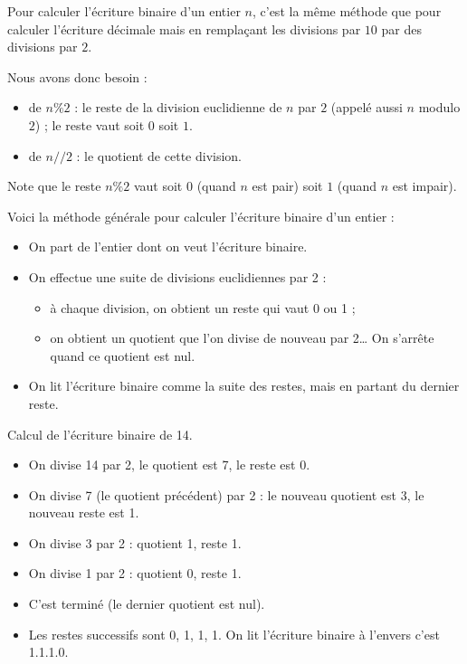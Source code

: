 \documentclass[11pt,class=report,crop=false]{standalone}
\begin{document}
\begin{cours}

Pour calculer l'écriture binaire d'un entier $n$, c'est la même méthode que pour calculer l'écriture décimale mais en remplaçant les divisions par $10$ par des divisions par $2$.

Nous avons donc besoin :
  \begin{itemize}
    \item de $n\%2$ : le reste de la division euclidienne de $n$ par $2$ (appelé aussi $n$ modulo $2$) ; le reste vaut soit $0$ soit $1$.
    \item de $n//2$ : le quotient de cette division. 
  \end{itemize}
  
  Note que le reste  $n\%2$ vaut soit $0$ (quand $n$ est pair) soit $1$ (quand $n$ est impair).
  
  Voici la méthode générale pour calculer l'écriture binaire d'un entier :
\begin{itemize}
  \item On part de l'entier dont on veut l'écriture binaire.
  
  \item On effectue une suite de divisions euclidiennes par 2 : 
  \begin{itemize}
    \item à chaque division, on obtient un reste qui vaut 0 ou 1 ; 
    \item on obtient un quotient que l'on divise de nouveau par 2\ldots{} On s'arrête quand ce quotient est nul.
  \end{itemize}
  
  \item On lit l'écriture binaire comme la suite des restes, mais en partant du dernier reste.
\end{itemize}

\begin{exemple}
Calcul de l'écriture binaire de 14.

\begin{itemize}
  \item On divise 14 par 2, le quotient est 7, le reste est 0.
  \item On divise 7 (le quotient précédent) par 2 : le nouveau quotient est 3, le nouveau reste est 1.
  \item On divise 3 par 2 : quotient 1, reste 1.
  \item On divise 1 par 2 : quotient 0, reste 1.
  \item C'est terminé (le dernier quotient est nul).
  \item Les restes successifs sont 0, 1, 1, 1. On lit l'écriture binaire à l'envers c'est 1.1.1.0.  
\end{itemize}


\end{exemple}
\end{cours}
\end{document}
